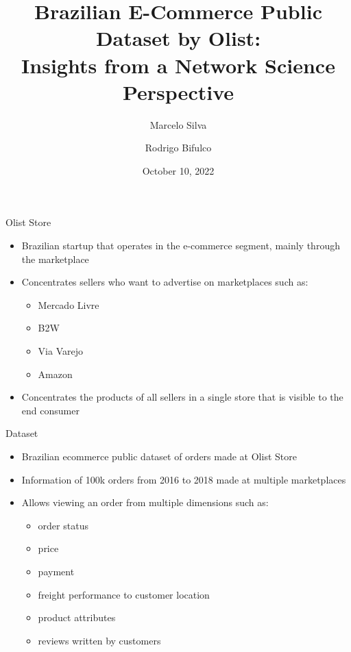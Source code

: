 \documentclass[aspectratio=169]{beamer}
\title{Brazilian E-Commerce Public Dataset by Olist: \\
    Insights from a Network Science Perspective}
\author{Marcelo Silva \and Rodrigo Bifulco}
\date{October 10, 2022}
\begin{document}
\begin{frame}
\titlepage
\end{frame}

\begin{frame}{Olist Store}
\begin{itemize}
    \item Brazilian startup that operates in the e-commerce segment, mainly
            through the marketplace \cite{olist-wiki}
    \item Concentrates sellers who want to advertise on marketplaces such as:
    \begin{itemize}
        \item Mercado Livre
        \item B2W
        \item Via Varejo
        \item Amazon
    \end{itemize}
    \item Concentrates the products of all sellers in a single store that is
            visible to the end consumer
\end{itemize}
\end{frame}

\begin{frame}{Dataset}
\begin{itemize}
    \item Brazilian ecommerce public dataset of orders made at Olist Store
        \cite{olist-sionek}
    \item Information of 100k orders from 2016 to 2018 made at multiple
            marketplaces
    \item Allows viewing an order from multiple dimensions such as: 
    \begin{itemize}
        \item order status
        \item price
        \item payment
        \item freight performance to customer location
        \item product attributes 
        \item reviews written by customers
    \end{itemize}
\end{itemize}
\end{frame}
\end{document}
